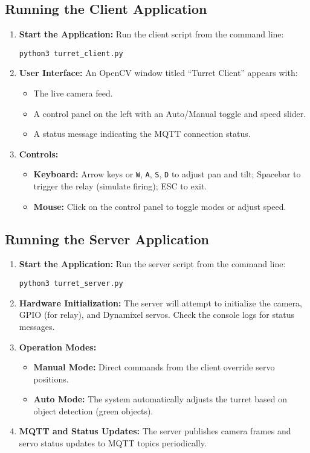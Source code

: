 \documentclass[12pt]{article}
\begin{document}
\subsection{Running the Client Application}
\begin{enumerate}[leftmargin=*, label=\arabic*.]
    \item \textbf{Start the Application:} Run the client script from the command line:
    \begin{verbatim}
python3 turret_client.py
    \end{verbatim}
    \item \textbf{User Interface:} An OpenCV window titled ``Turret Client'' appears with:
    \begin{itemize}[leftmargin=*, label={--}]
        \item The live camera feed.
        \item A control panel on the left with an Auto/Manual toggle and speed slider.
        \item A status message indicating the MQTT connection status.
    \end{itemize}
    \item \textbf{Controls:} 
    \begin{itemize}[leftmargin=*, label={--}]
        \item \textbf{Keyboard:} Arrow keys or \texttt{W}, \texttt{A}, \texttt{S}, \texttt{D} to adjust pan and tilt; Spacebar to trigger the relay (simulate firing); ESC to exit.
        \item \textbf{Mouse:} Click on the control panel to toggle modes or adjust speed.
    \end{itemize}
\end{enumerate}

\subsection{Running the Server Application}
\begin{enumerate}[leftmargin=*, label=\arabic*.]
    \item \textbf{Start the Application:} Run the server script from the command line:
    \begin{verbatim}
python3 turret_server.py
    \end{verbatim}
    \item \textbf{Hardware Initialization:} The server will attempt to initialize the camera, GPIO (for relay), and Dynamixel servos. Check the console logs for status messages.
    \item \textbf{Operation Modes:}
    \begin{itemize}[leftmargin=*, label={--}]
        \item \textbf{Manual Mode:} Direct commands from the client override servo positions.
        \item \textbf{Auto Mode:} The system automatically adjusts the turret based on object detection (green objects).
    \end{itemize}
    \item \textbf{MQTT and Status Updates:} The server publishes camera frames and servo status updates to MQTT topics periodically.
\end{enumerate}
\end{document}
